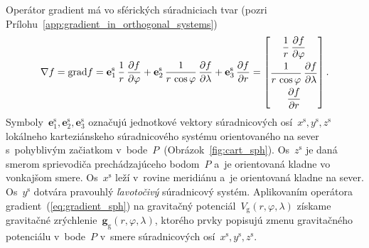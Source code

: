 \documentclass[a4paper, 12pt]{book}
\newcommand{\grad}{\mathrm{grad}}
\newcommand{\gidx}{\mathrm g}
\let\vec\mathbf
\begin{document}
Operátor gradient má vo sférických súradniciach tvar (pozri 
Prílohu~\ref{app:gradient_in_orthogonal_systems})
%
\begin{equation}
\label{eq:gradient_sph}
\nabla f = \grad f = \vec e_1^\mathrm{s} \, \frac{1}{r} \, \frac{\partial 
f}{\partial \varphi} + \vec e_2^\mathrm{s} \, \frac{1}{r \, \cos\varphi} \, 
\frac{\partial f}{\partial \lambda} + \vec e_3^\mathrm{s} \, \frac{\partial 
f}{\partial r}\\
%
=
%
\begin{bmatrix}
\dfrac{1}{r} \, \dfrac{\partial f}{\partial \varphi} \\[2ex]
\dfrac{1}{r \, \cos\varphi} \, \dfrac{\partial f}{\partial \lambda}\\[2ex]
\dfrac{\partial f}{\partial r}
\end{bmatrix}
{.}
\end{equation}
%
Symboly~$\vec{e}_1^\mathrm{s}, \vec{e}_2^{\mathrm{s}}, \vec{e}_3^\mathrm{s}$ 
označujú jednotkové vektory súradnicových osí~$x^\mathrm{s}, y^\mathrm{s}, 
z^\mathrm{s}$ lokálneho karteziánskeho súradnicového systému orientovaného na 
sever s~pohyblivým začiatkom v~bode~$P$~(Obrázok~\ref{fig:cart_sph}).  
Os~$z^\mathrm{s}$ je daná smerom sprievodiča prechádzajúceho bodom~$P$ a~je 
orientovaná kladne vo vonkajšom smere.  Os~$x^\mathrm{s}$ leží v~rovine 
meridiánu a~je orientovaná kladne na sever.  Os~$y^\mathrm{s}$ dotvára 
pravouhlý \emph{ľavotočivý} súradnicový systém.  Aplikovaním operátora 
gradient~(\ref{eq:gradient_sph}) na gravitačný potenciál~$V_\gidx(r, \varphi, 
\lambda)$ získame gravitačné zrýchlenie~$\vec g_\gidx(r, \varphi, \lambda)$, 
ktorého prvky popisujú zmenu gravitačného potenciálu v~bode~$P$ v~smere 
súradnicových osí~$x^\mathrm{s}, y^\mathrm{s}, z^\mathrm{s}$.
\end{document}
